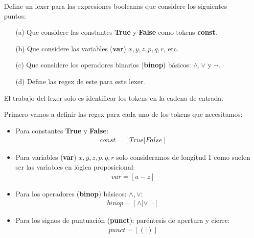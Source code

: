 \begin{Pro}
 Define un lexer para las expresiones booleanas que considere los siguientes puntos:


\begin{enumerate}
    \item[(a)] Que considere las constantes \textbf{True} y \textbf{False} como tokens \textbf{const}.
    
    \item[(b)] Que considere las variables (\textbf{var}) $x, y, z, p, q, r$, etc.

    \item[(c)] Que considere los operadores binarios (\textbf{binop}) básicos: $\land, \lor$ y $\lnot$.

    \item[(d)] Define las regex de este para este lexer.
\end{enumerate}

\end{Pro}

El trabajo del lexer solo es identificar los tokens en la cadena de entrada.

Primero vamos a definir las regex para cada uno de los tokens que necesitamos:
\begin{itemize}
    \item Para constantes \textbf{True} y \textbf{False}:
    \begin{align*}
        const = [True | False]
    \end{align*}

    \item Para variables (\textbf{var}) $x, y, z, p, q, r$ solo consideramos de longitud 1 como suelen ser las variables en lógica proposicional:
    \begin{align*}
        var = [a-z]
    \end{align*}

    \item Para los operadores (\textbf{binop}) básicos: $\land, \lor$:
    \begin{align*}
        binop = [\land | \lor | \lnot]
    \end{align*}
 

    \item Para los signos de puntuación (\textbf{punct}): paréntesis de apertura y cierre:
    \begin{align*}
        punct = [ ( | ) ]
    \end{align*}

\end{itemize}


